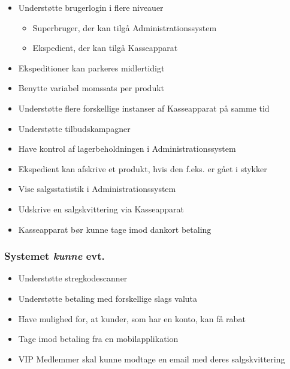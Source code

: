 \begin{itemize}

\item Understøtte brugerlogin i flere niveauer
\begin{itemize}
\item Superbruger, der kan tilgå Administrationssystem\\
\item Ekspedient, der kan tilgå Kasseapparat
\end{itemize}
\item Ekspeditioner kan parkeres midlertidigt
\item Benytte variabel momssats per produkt
\item Understøtte flere forskellige instanser af Kasseapparat på samme tid
\item Understøtte tilbudskampagner
\item Have kontrol af lagerbeholdningen i Administrationssystem
\item Ekspedient kan afskrive et produkt, hvis den f.eks. er gået i stykker
\item Vise salgsstatistik i Administrationssystem
\item Udskrive en salgskvittering via Kasseapparat
\item Kasseapparat bør kunne tage imod dankort betaling

\end{itemize}


\subsubsection*{Systemet \textit{kunne} evt.}

\begin{itemize}

\item Understøtte stregkodescanner
\item Understøtte betaling med forskellige slags valuta
\item Have mulighed for, at kunder, som har en konto, kan få rabat
\item Tage imod betaling fra en mobilapplikation
\item VIP Medlemmer skal kunne modtage en email med deres salgskvittering

\end{itemize}